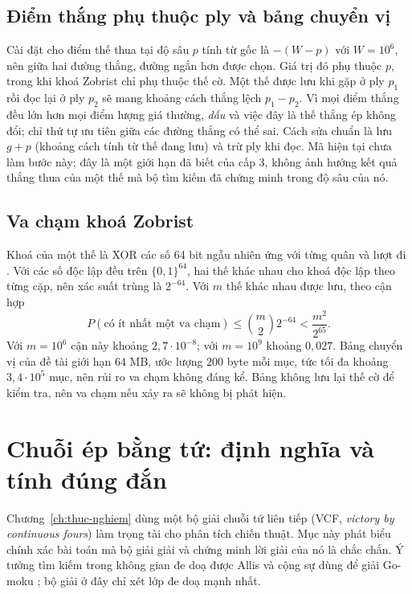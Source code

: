 \subsection{Điểm thắng phụ thuộc ply và bảng chuyển vị}
\label{sec:cs-mate-tt}
Cài đặt cho điểm thế thua tại độ sâu $p$ tính từ gốc là $-(W-p)$ với $W=10^6$, nên giữa hai đường thắng, đường
ngắn hơn được chọn. Giá trị đó phụ thuộc $p$, trong khi khoá Zobrist chỉ phụ thuộc thế cờ. Một thế được lưu khi
gặp ở ply $p_1$ rồi đọc lại ở ply $p_2$ sẽ mang khoảng cách thắng lệch $p_1-p_2$. Vì mọi điểm thắng đều lớn hơn
mọi điểm lượng giá thường, \emph{dấu} và việc đây là thế thắng ép không đổi; chỉ thứ tự ưu tiên giữa các đường
thắng có thể sai. Cách sửa chuẩn là lưu $g+p$ (khoảng cách tính từ thế đang lưu) và trừ ply khi đọc. Mã hiện tại
chưa làm bước này; đây là một giới hạn đã biết của cấp 3, không ảnh hưởng kết quả thắng thua của một thế mà bộ
tìm kiếm đã chứng minh trong độ sâu của nó.

\subsection{Va chạm khoá Zobrist}
\label{sec:cs-zobrist}
Khoá của một thế là XOR các số 64 bit ngẫu nhiên ứng với từng quân và lượt đi \cite{zobrist1970}. Với các số độc
lập đều trên $\{0,1\}^{64}$, hai thế khác nhau cho khoá độc lập theo từng cặp, nên xác suất trùng là $2^{-64}$.
Với $m$ thế khác nhau được lưu, theo cận hợp
\begin{equation}
  P(\text{có ít nhất một va chạm})\le\binom{m}{2}2^{-64}<\frac{m^2}{2^{65}}.
  \label{eq:cs-va-cham}
\end{equation}
Với $m=10^6$ cận này khoảng $2{,}7\cdot10^{-8}$; với $m=10^9$ khoảng $0{,}027$. Bảng chuyển vị của đề tài giới
hạn $64$ MB, ước lượng $200$ byte mỗi mục, tức tối đa khoảng $3{,}4\cdot10^5$ mục, nên rủi ro va chạm không đáng
kể. Bảng không lưu lại thế cờ để kiểm tra, nên va chạm nếu xảy ra sẽ không bị phát hiện.

\section{Chuỗi ép bằng tứ: định nghĩa và tính đúng đắn}
\label{sec:cs-vcf-lt}
Chương~\ref{ch:thuc-nghiem} dùng một bộ giải chuỗi tứ liên tiếp (VCF, \emph{victory by continuous fours}) làm
trọng tài cho phân tích chiến thuật. Mục này phát biểu chính xác bài toán mà bộ giải giải và chứng minh lời giải
của nó là chắc chắn. Ý tưởng tìm kiếm trong không gian đe doạ được Allis và cộng sự dùng để giải Go-moku
\cite{allis1996gomoku,allis1994}; bộ giải ở đây chỉ xét lớp đe doạ mạnh nhất.

